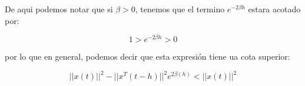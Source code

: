             De aqui podemos notar que si $\beta > 0$, tenemos que el termino $e^{-2 \beta h}$ estara acotado por:

            \begin{equation*}
                1 > e^{-2  \beta h} > 0
            \end{equation*}

            por lo que en general, podemos decir que esta expresión tiene ua cota superior:

            \begin{equation}
                || x(t) ||^2 - || x^T(t - h) ||^2 e^{2 \beta (h)} < || x(t) ||^2
            \end{equation}

